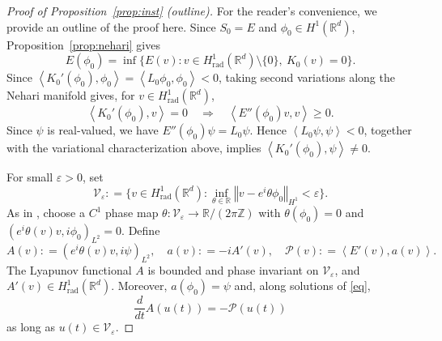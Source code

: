 \documentclass[12pt, a4paper, reqno]{amsart}
\numberwithin{equation}{section}
\theoremstyle{definition}
\theoremstyle{remark}
\newcommand{\Z}{\mathbb Z}
\newcommand{\R}{\mathbb R}
\def\tbra[#1,#2]{{\left\langle #1,#2\right\rangle}}
\def\rbra[#1,#2]{{\left( #1,#2\right)}}
\def\norm[#1]{{\left\Vert #1 \right\Vert}}
\newcommand{\rad}{\mathrm{rad}}
\newcommand{\ce}{\mathrel{\mathop:}=}
\begin{document}
\begin{proof}[Proof of Proposition~\ref{prop:inst} (outline)]
For the reader's convenience, we provide an outline of the proof here.
Since $S_0=E$ and $\phi_0\in H^1(\R^d)$, Proposition~\ref{prop:nehari}
gives
\begin{equation}\label{eq:nehari0}
  E(\phi_0)=\inf\{E(v):v\in H^1_{\rad}(\R^d)\setminus\{0\},\ K_0(v)=0\}.
\end{equation}
Since $\tbra[K_0'(\phi_0),\phi_0]=\tbra[L_0\phi_0,\phi_0]<0$,
taking second variations along the Nehari manifold gives, for
$v\in H^1_{\rad}(\R^d)$,
\begin{equation}\label{eq:ntan}
  \tbra[K_0'(\phi_0),v]=0
  \quad\Longrightarrow\quad
  \tbra[E''(\phi_0)v,v]\ge0.
\end{equation}
Since $\psi$ is real-valued, we have
$E''(\phi_0)\psi=L_0\psi$. Hence $\tbra[L_0\psi,\psi]<0$, together with the variational characterization above, implies $\tbra[K_0'(\phi_0),\psi]\ne0$.

For small $\varepsilon>0$, set
\[
  \mathcal V_\varepsilon
  \ce\{v\in H^1_{\rad}(\R^d):
       \inf_{\theta\in\R}\norm[v-e^{i\theta}\phi_0]_{H^1}<\varepsilon\}.
\]
As in \cite[Lemma~5.6]{FH25}, choose a $C^1$ phase map
$\theta\colon\mathcal V_\varepsilon\to\R/(2\pi\Z)$ with
$\theta(\phi_0)=0$ and
$\rbra[e^{i\theta(v)}v,i\phi_0]_{L^2}=0$. Define
\[
  A(v)\ce\rbra[e^{i\theta(v)}v,i\psi]_{L^2},
  \quad a(v)\ce-iA'(v),
  \quad \mathcal P(v)\ce\tbra[E'(v),a(v)].
\]
The Lyapunov functional $A$ is bounded and phase invariant on
$\mathcal V_\varepsilon$, and $A'(v)\in H^1_{\rad}(\R^d)$.
Moreover, $a(\phi_0)=\psi$ and, along solutions of \eqref{eq},
\begin{equation}\label{eq:Adot}
  \frac{d}{dt}A(u(t))=-\mathcal P(u(t))
\end{equation}
as long as $u(t)\in\mathcal V_\varepsilon$.


\end{proof}
\end{document}
